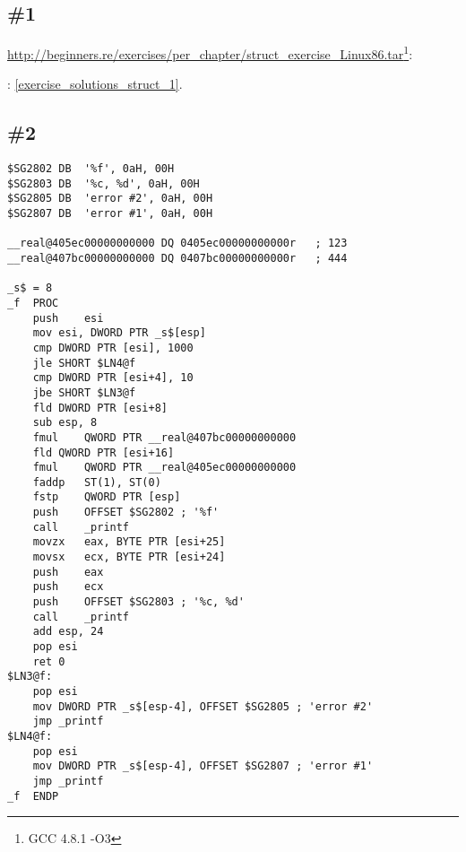 \section{\Exercises}

\subsection{\Exercise \#1}
\label{exercise_struct_1}

\url{http://beginners.re/exercises/per_chapter/struct_exercise_Linux86.tar}\footnote{GCC 4.8.1 -O3}:\\

\Answer{}: \ref{exercise_solutions_struct_1}.

\subsection{\Exercise \#2}
\label{exercise_struct_2}


\begin{lstlisting}[caption=\Optimizing MSVC 2010]
$SG2802	DB	'%f', 0aH, 00H
$SG2803	DB	'%c, %d', 0aH, 00H
$SG2805	DB	'error #2', 0aH, 00H
$SG2807	DB	'error #1', 0aH, 00H

__real@405ec00000000000 DQ 0405ec00000000000r	; 123
__real@407bc00000000000 DQ 0407bc00000000000r	; 444

_s$ = 8
_f	PROC
	push	esi
	mov	esi, DWORD PTR _s$[esp]
	cmp	DWORD PTR [esi], 1000
	jle	SHORT $LN4@f
	cmp	DWORD PTR [esi+4], 10
	jbe	SHORT $LN3@f
	fld	DWORD PTR [esi+8]
	sub	esp, 8
	fmul	QWORD PTR __real@407bc00000000000
	fld	QWORD PTR [esi+16]
	fmul	QWORD PTR __real@405ec00000000000
	faddp	ST(1), ST(0)
	fstp	QWORD PTR [esp]
	push	OFFSET $SG2802 ; '%f'
	call	_printf
	movzx	eax, BYTE PTR [esi+25]
	movsx	ecx, BYTE PTR [esi+24]
	push	eax
	push	ecx
	push	OFFSET $SG2803 ; '%c, %d'
	call	_printf
	add	esp, 24
	pop	esi
	ret	0
$LN3@f:
	pop	esi
	mov	DWORD PTR _s$[esp-4], OFFSET $SG2805 ; 'error #2'
	jmp	_printf
$LN4@f:
	pop	esi
	mov	DWORD PTR _s$[esp-4], OFFSET $SG2807 ; 'error #1'
	jmp	_printf
_f	ENDP
\end{lstlisting}

